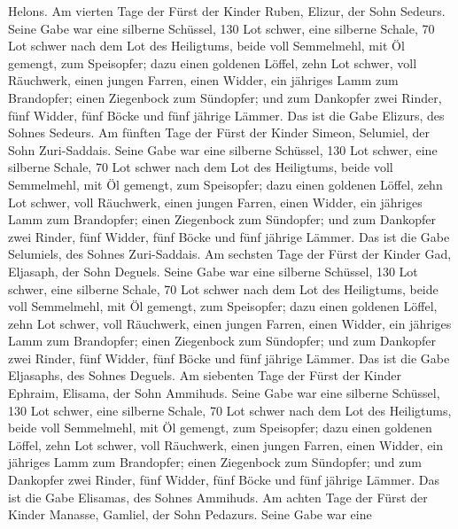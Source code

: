 Helons.  Am vierten Tage der Fürst der Kinder Ruben,
Elizur, der Sohn Sedeurs.  Seine Gabe war eine silberne
Schüssel, 130 Lot schwer, eine silberne Schale, 70 Lot schwer nach dem
Lot des Heiligtums, beide voll Semmelmehl, mit Öl gemengt, zum
Speisopfer;  dazu einen goldenen Löffel, zehn Lot schwer,
voll Räuchwerk,  einen jungen Farren, einen Widder, ein
jähriges Lamm zum Brandopfer;  einen Ziegenbock zum
Sündopfer;  und zum Dankopfer zwei Rinder, fünf Widder,
fünf Böcke und fünf jährige Lämmer. Das ist die Gabe Elizurs, des Sohnes
Sedeurs.  Am fünften Tage der Fürst der Kinder Simeon,
Selumiel, der Sohn Zuri-Saddais.  Seine Gabe war eine
silberne Schüssel, 130 Lot schwer, eine silberne Schale, 70 Lot schwer
nach dem Lot des Heiligtums, beide voll Semmelmehl, mit Öl gemengt, zum
Speisopfer;  dazu einen goldenen Löffel, zehn Lot schwer,
voll Räuchwerk,  einen jungen Farren, einen Widder, ein
jähriges Lamm zum Brandopfer;  einen Ziegenbock zum
Sündopfer;  und zum Dankopfer zwei Rinder, fünf Widder,
fünf Böcke und fünf jährige Lämmer. Das ist die Gabe Selumiels, des
Sohnes Zuri-Saddais.  Am sechsten Tage der Fürst der Kinder
Gad, Eljasaph, der Sohn Deguels.  Seine Gabe war eine
silberne Schüssel, 130 Lot schwer, eine silberne Schale, 70 Lot schwer
nach dem Lot des Heiligtums, beide voll Semmelmehl, mit Öl gemengt, zum
Speisopfer;  dazu einen goldenen Löffel, zehn Lot schwer,
voll Räuchwerk,  einen jungen Farren, einen Widder, ein
jähriges Lamm zum Brandopfer;  einen Ziegenbock zum
Sündopfer;  und zum Dankopfer zwei Rinder, fünf Widder,
fünf Böcke und fünf jährige Lämmer. Das ist die Gabe Eljasaphs, des
Sohnes Deguels.  Am siebenten Tage der Fürst der Kinder
Ephraim, Elisama, der Sohn Ammihuds.  Seine Gabe war eine
silberne Schüssel, 130 Lot schwer, eine silberne Schale, 70 Lot schwer
nach dem Lot des Heiligtums, beide voll Semmelmehl, mit Öl gemengt, zum
Speisopfer;  dazu einen goldenen Löffel, zehn Lot schwer,
voll Räuchwerk,  einen jungen Farren, einen Widder, ein
jähriges Lamm zum Brandopfer;  einen Ziegenbock zum
Sündopfer;  und zum Dankopfer zwei Rinder, fünf Widder,
fünf Böcke und fünf jährige Lämmer. Das ist die Gabe Elisamas, des
Sohnes Ammihuds.  Am achten Tage der Fürst der Kinder
Manasse, Gamliel, der Sohn Pedazurs.  Seine Gabe war eine
